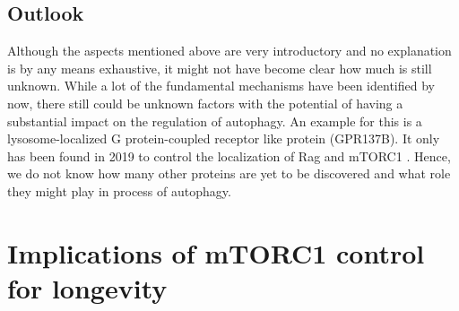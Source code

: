 \documentclass[12pt]{article} %
\begin{document}
\begin{linenumbers*}
\subsection{Outlook}
Although the aspects mentioned above are very introductory and no explanation is by any means exhaustive, it might not have become clear how much is still unknown. While a lot of the fundamental mechanisms have been identified by now, there still could be unknown factors with the potential of having a substantial impact on the regulation of autophagy. An example for this is a lysosome-localized G protein-coupled receptor like protein (GPR137B). It only has been found in 2019 to control the localization of Rag and mTORC1 \citep{Gan2019}. Hence, we do not know how many other proteins are yet to be discovered and what role they might play in process of autophagy.



\section{Implications of mTORC1 control for longevity}


\end{linenumbers*}
\end{document}
